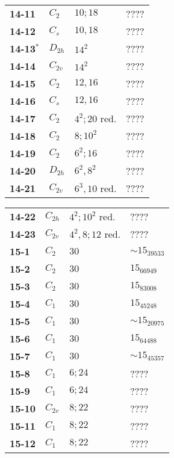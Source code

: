 \documentclass[12pt]{article}
\begin{document}
\begin{table}
\begin{center}
{\begin{minipage}{7cm}
\begin{tabular}{||l|l|l|l||}
{\bf 14-11}     &$C_2$  &$10; 18$               &????\\
{\bf 14-12}     &$C_s$  &$10, 18$               &????\\
{\bf 14-13${}^{*}$}     &$D_{2h}$       &$14^2$         &????\\
{\bf 14-14}     &$C_{2v}$       &$14^2$         &????\\
{\bf 14-15}     &$C_2$  &$12, 16$               &????\\
{\bf 14-16}     &$C_{s}$        &$12, 16$               &????\\
{\bf 14-17}     &$C_2$  &$4^2; 20$ red. &????\\
{\bf 14-18}     &$C_2$  &$8; 10^2$      &????\\
{\bf 14-19}     &$C_2$  &$6^2; 16$      &????\\
{\bf 14-20}     &$D_{2h}$       &$6^2, 8^2$     &????\\
{\bf 14-21}     &$C_{2v}$       &$6^3, 10$ red. &????\\
\hline\hline
\end{tabular}
\end{minipage}
\begin{minipage}[t]{7cm}
\begin{tabular}{||l|l|l|l||}
\hline\hline
{\bf 14-22}     &$C_{2h}$       &$4^2; 10^2$ red.       &????\\
{\bf 14-23}     &$C_{2v}$       &$4^2, 8; 12$ red.      &????\\\hline
{\bf 15-1}      &$C_2$  &$30$   &$\sim 15_{39533}$\\
{\bf 15-2}      &$C_2$  &$30$   &$15_{66949}$\\
{\bf 15-3}      &$C_2$  &$30$   &$15_{83008}$\\
{\bf 15-4}      &$C_1$  &$30$   &$15_{45248}$\\
{\bf 15-5}      &$C_1$  &$30$   &$\sim 15_{20975}$\\
{\bf 15-6}      &$C_1$  &$30$   &$15_{64488}$\\
{\bf 15-7}      &$C_1$  &$30$   &$\sim 15_{45357}$\\
{\bf 15-8}      &$C_1$  &$6; 24$        &????\\
{\bf 15-9}      &$C_1$  &$6; 24$        &????\\
{\bf 15-10}     &$C_{2v}$       &$8; 22$     &????\\
{\bf 15-11}     &$C_1$  &$8; 22$        &????\\
{\bf 15-12}     &$C_1$  &$8; 22$        &????\\

\end{tabular}
\end{minipage}}
\end{center}
\end{table}
\end{document}
